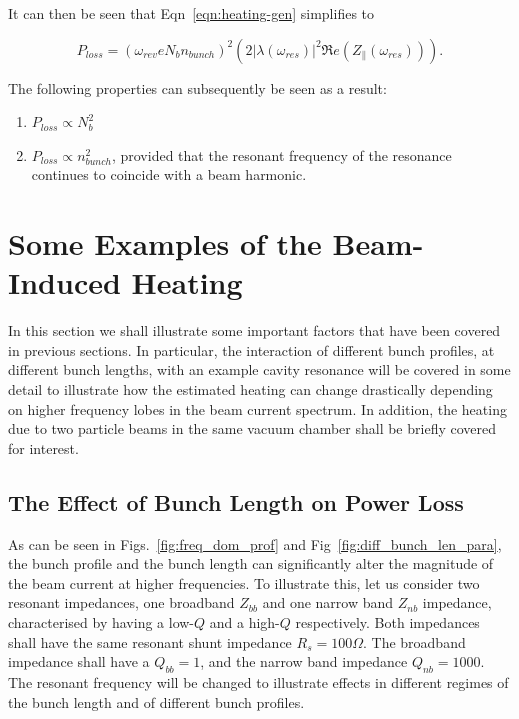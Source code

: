 \documentclass{cernyrep}
\begin{document}
It can then be seen that Eqn~\ref{eqn:heating-gen} simplifies to

\begin{equation}
P_{loss} = \left( \omega_{rev}eN_{b}n_{bunch}  \right)^{2}  \left( 2 \left| \lambda \left( \omega_{res} \right)  \right|^{2}  \Re{}e \left( Z_{\parallel} \left(\omega_{res} \right) \right) \right). 
\label{eqn:heating-high-q}
\end{equation}

The following properties can subsequently be seen as a result:

\begin{enumerate}
\item{$P_{loss} \propto N_{b}^{2}$}
\item{$P_{loss} \propto n_{bunch}^{2}$, provided that the resonant frequency of the resonance continues to coincide with a beam harmonic.}
\end{enumerate}

\section{Some Examples of the Beam-Induced Heating}

In this section we shall illustrate some important factors that have been covered in previous sections. In particular, the interaction of different bunch profiles, at different bunch lengths, with an example cavity resonance will be covered in some detail to illustrate how the estimated heating can change drastically depending on higher frequency lobes in the beam current spectrum. In addition, the heating due to two particle beams in the same vacuum chamber shall be briefly covered for interest.

\subsection{The Effect of Bunch Length on Power Loss}

As can be seen in Figs.~\ref{fig:freq_dom_prof} and Fig~\ref{fig:diff_bunch_len_para}, the bunch profile and the bunch length can significantly alter the magnitude of the beam current at higher frequencies. To illustrate this, let us consider two resonant impedances, one broadband $Z_{bb}$ and one narrow band $Z_{nb}$ impedance, characterised by having a low-$Q$ and a high-$Q$ respectively. Both impedances shall have the same resonant shunt impedance $R_{s} = 100\Omega$. The broadband impedance shall have a $Q_{bb}=1$, and the narrow band impedance $Q_{nb}=1000$. The resonant frequency will be changed to illustrate effects in different regimes of the bunch length and of different bunch profiles.
\end{document}
